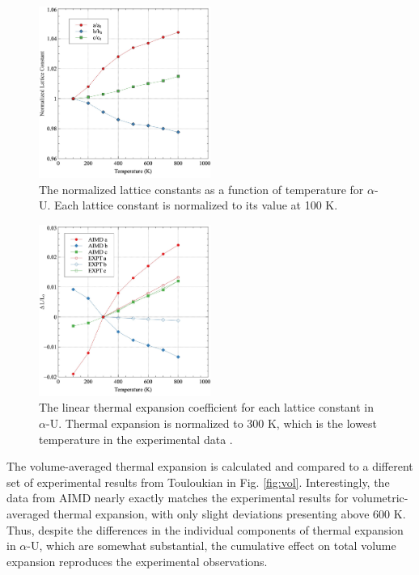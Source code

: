 \documentclass[utf8]{frontiersSCNS} %
\providecommand{\DIFaddtex}[1]{{\bf #1}} %
\providecommand{\DIFdeltex}[1]{} %
\providecommand{\DIFaddFL}[1]{\DIFadd{#1}} %
\providecommand{\DIFdelFL}[1]{\DIFdel{#1}} %
\providecommand{\DIFaddbeginFL}{} %
\providecommand{\DIFaddendFL}{} %
\providecommand{\DIFdelbeginFL}{} %
\providecommand{\DIFdelendFL}{} %
\providecommand{\DIFadd}[1]{\texorpdfstring{\DIFaddtex{#1}}{#1}} %
\providecommand{\DIFdel}[1]{\texorpdfstring{\DIFdeltex{#1}}{}} %
\begin{document}
 \begin{figure}[hbt]
	\centering
	\DIFdelbeginFL %
\DIFdelendFL \DIFaddbeginFL \includegraphics[width=0.5\textwidth]{a0_norm.jpg}
    \DIFaddendFL \caption{The normalized lattice constants as a function of temperature for $\alpha$-U. Each lattice constant is normalized to its value at 100 K.}\label{fig:a0}
\end{figure}

 \begin{figure}[hbt]
	\centering
	\DIFdelbeginFL %
\DIFdelendFL \DIFaddbeginFL \includegraphics[width=0.5\textwidth]{lte.jpg}
    \DIFaddendFL \caption{The linear thermal expansion coefficient for each lattice constant in $\alpha$-U. Thermal expansion is normalized to 300 K, which is the lowest temperature in the experimental data \DIFdelbeginFL \DIFdelFL{\cite{grenthe2010, lloyd1966}}\DIFdelendFL \DIFaddbeginFL \DIFaddFL{\cite{touloukian}}\DIFaddendFL . }\label{fig:exp}
\end{figure}

\FloatBarrier

The volume-averaged thermal expansion is calculated and compared to a different set of experimental results from Touloukian \cite{touloukian} in Fig. \ref{fig:vol}. Interestingly, the data from AIMD nearly exactly matches the experimental results for volumetric-averaged thermal expansion, with only slight deviations presenting above 600 K. Thus, despite the differences in the individual components of thermal expansion in $\alpha$-U, which are somewhat substantial, the cumulative effect on total volume expansion reproduces the experimental observations. 
\end{document}
